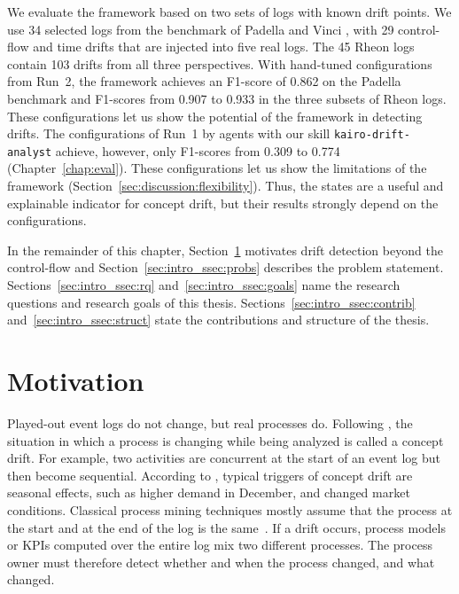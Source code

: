 We evaluate the framework based on two sets of logs with known drift points. We use 34 selected logs from the benchmark of Padella and Vinci \autocite{padella2026everything}, with 29 control-flow and time drifts that are injected into five real logs. The 45 Rheon logs contain 103 drifts from all three perspectives. With hand-tuned configurations from Run~2, the framework achieves an F1-score of 0.862 on the Padella benchmark and F1-scores from 0.907 to 0.933 in the three subsets of Rheon logs. These configurations let us show the potential of the framework in detecting drifts. The configurations of Run~1 by agents with our skill \texttt{kairo-drift-analyst} achieve, however, only F1-scores from 0.309 to 0.774 (Chapter~\ref{chap:eval}). These configurations let us show the limitations of the framework (Section~\ref{sec:discussion:flexibility}). Thus, the states are a useful and explainable indicator for concept drift, but their results strongly depend on the configurations.

In the remainder of this chapter, Section~\ref{sec:intro_ssec:motiv} motivates drift detection beyond the control-flow and Section~\ref{sec:intro_ssec:probs} describes the problem statement. Sections~\ref{sec:intro_ssec:rq} and~\ref{sec:intro_ssec:goals} name the research questions and research goals of this thesis. Sections~\ref{sec:intro_ssec:contrib} and~\ref{sec:intro_ssec:struct} state the contributions and structure of the thesis.

\section{Motivation}
\label{sec:intro_ssec:motiv}
Played-out event logs do not change, but real processes do. Following \textcite{vanderaalst2016process}, the situation in which a process is changing while being analyzed is called a concept drift. For example, two activities are concurrent at the start of an event log but then become sequential. According to \textcite{vanderaalst2016process}, typical triggers of concept drift are seasonal effects, such as higher demand in December, and changed market conditions. Classical process mining techniques mostly assume that the process at the start and at the end of the log is the same~\autocite{bose2011handling}. If a drift occurs, process models or KPIs computed over the entire log mix two different processes. The process owner must therefore detect whether and when the process changed, and what changed.

